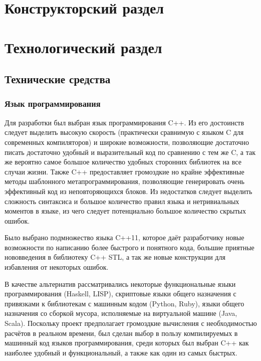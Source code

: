 \documentclass[a4paper,12pt]{report}
\begin{document}

\section{Конструкторский раздел}

\section{Технологический раздел}

\subsection{Технические средства}

\subsubsection{Язык программирования}
Для разработки был выбран язык программирования C++. Из его достоинств следует выделить высокую скорость (практически сравнимую с языком C для современных компиляторов) и широкие возможности, позволяющие достаточно писать достаточно удобный и выразительный код по сравнению с тем же C, а так же вероятно самое большое количество удобных сторонних библиотек на все случаи жизни. Также C++ предоставляет громоздкие но крайне эффективные методы шаблонного метапрограммирования, позволяющие генерировать очень эффективный код из неповторяющихся блоков. Из недостатков следует выделить сложность синтаксиса и большое количество правил языка и нетривиальных моментов в языке, из чего следует потенциально большое количество скрытых ошибок.

Было выбрано подмножество языка C++11, которое даёт разработчику новые возможности по написанию более быстрого и понятного кода, большие приятные нововведения в библиотеку C++ STL, а так же новые конструкции для избавления от некоторых ошибок.

В качестве альтернатив рассматривались некоторые функциональные языки программирования (Haskell, LISP), скриптовые языки общего назначения с привязками к библиотекам с машинным кодом (Python, Ruby), языки общего назначения со сборкой мусора, исполняемые на виртуальной машине (Java, Scala). Поскольку проект предполагает громоздкие вычисления с необходимостью расчётов в реальном времени, был сделан выбор в пользу компилируемых в машинный код языков программирования, среди которых был выбран C++ как наиболее удобный и функциональный, а также как один из самых быстрых.
\end{document}
